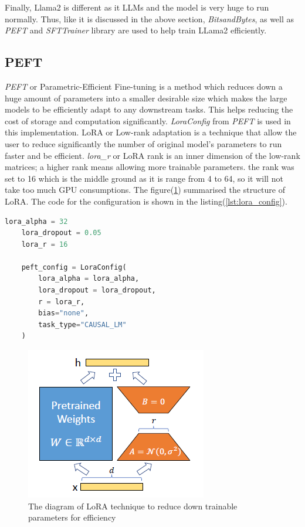 Finally, Llama2 is different as it LLMs and the model is very huge to run normally. Thus, like it is discussed in the above section, \textit{BitsandBytes}, as well as \textit{PEFT} and \textit{SFTTrainer} library are used to help train LLama2 efficiently\cite{Huggingface_peft}. 

\subsection{PEFT}
\textit{PEFT} or Parametric-Efficient Fine-tuning is a method which reduces down a huge amount of parameters into a smaller desirable size which makes the large models to be efficiently adapt to any downstream tasks\cite{Huggingface_peft}. This helps reducing the cost of storage and computation significantly\cite{Huggingface_peft}. \textit{LoraConfig} from \textit{PEFT} is used in this implementation. LoRA or Low-rank adaptation is a technique that allow the user to reduce significantly the number of original model's parameters to run faster and be efficient\cite{HuggingFace_lora}. \textit{lora\_r} or LoRA rank is an inner dimension of the low-rank matrices; a higher rank means allowing more trainable parameters\cite{HuggingFace_lora}. the rank was set to 16 which is the middle ground as it is range from 4 to 64, so it will not take too much GPU consumptions\cite{HuggingFace_lora}. The figure(\ref{fig:Lora}) summarised the structure of LoRA. The code for the configuration is shown in the listing(\ref{lst:lora_config}).
\bigskip

\begin{lstlisting}[language=Python, caption=The code for LoRA configuration, label=lst:lora_config]
    lora_alpha = 32
    lora_dropout = 0.05
    lora_r = 16
    
    peft_config = LoraConfig(
        lora_alpha = lora_alpha,
        lora_dropout = lora_dropout,
        r = lora_r,
        bias="none",
        task_type="CAUSAL_LM"
    )
\end{lstlisting}

\begin{figure}[h!]
    \centerline{\includegraphics[scale=0.7]{Figures/Lora_brief.png}}
    \caption{The diagram of LoRA technique to reduce down trainable parameters for efficiency}
    \label{fig:Lora}
\end{figure}

